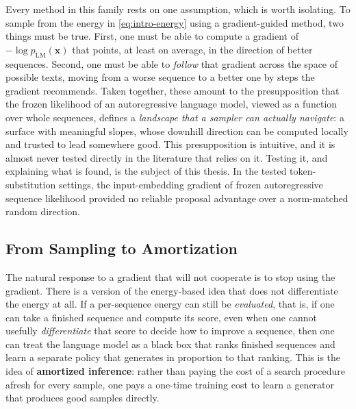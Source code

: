 Every method in this family rests on one assumption, which is worth isolating. To sample from the energy in \eqref{eq:intro-energy} using a gradient-guided method, two things must be true. First, one must be able to compute a gradient of $-\log p_{\text{LM}}(\bm{x})$ that points, at least on average, in the direction of better sequences. Second, one must be able to \emph{follow} that gradient across the space of possible texts, moving from a worse sequence to a better one by steps the gradient recommends. Taken together, these amount to the presupposition that the frozen likelihood of an autoregressive language model, viewed as a function over whole sequences, defines a \emph{landscape that a sampler can actually navigate}: a surface with meaningful slopes, whose downhill direction can be computed locally and trusted to lead somewhere good. This presupposition is intuitive, and it is almost never tested directly in the literature that relies on it. Testing it, and explaining what is found, is the subject of this thesis. In the tested token-substitution settings, the input-embedding gradient of frozen autoregressive sequence likelihood provided no reliable proposal advantage over a norm-matched random direction.

\subsection{From Sampling to Amortization}
\label{sec:intro-amortize}

The natural response to a gradient that will not cooperate is to stop using the gradient. There is a version of the energy-based idea that does not differentiate the energy at all. If a per-sequence energy can still be \emph{evaluated}, that is, if one can take a finished sequence and compute its score, even when one cannot usefully \emph{differentiate} that score to decide how to improve a sequence, then one can treat the language model as a black box that ranks finished sequences and learn a separate policy that generates in proportion to that ranking. This is the idea of \textbf{amortized inference}: rather than paying the cost of a search procedure afresh for every sample, one pays a one-time training cost to learn a generator that produces good samples directly.

